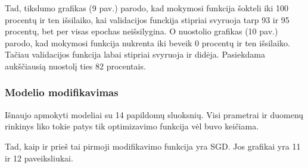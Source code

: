 \documentclass{VUMIFPSkursinis}
\begin{document}
Tad, tikslumo grafikas (9 pav.) parodo, kad mokymosi funkcija šokteli iki 100 procentų ir ten išsilaiko, kai validacijos funckija stipriai svyruoja tarp 93 ir 95 procentų, bet per visas epochas neišsilygina.
O nuostolio grafikas (10 pav.) parodo, kad mokymosi funkcija nukrenta iki beveik 0 procentų ir ten išsilaiko. Tačiau validacijos funkcija labai stipriai svyruoja ir didėja. Pasiekdama aukščiausią nuostolį ties 82 procentais.

\subsubsection{Modelio modifikavimas}
Išnaujo apmokyti modeliai su 14 papildomų sluoksnių. Visi prametrai ir duomenų rinkinys liko tokie patys tik optimizavimo funkcija vėl buvo keičiama.

Tad, kaip ir prieš tai pirmoji modifikavimo funkcija yra SGD. Jos grafikai yra 11 ir 12 paveiksliukai.
\end{document}
